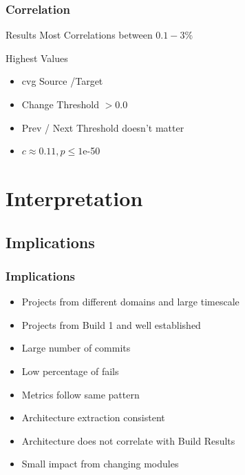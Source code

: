 \documentclass{beamer}
\begin{document}
\begin{frame}
	\frametitle{Correlation}
	
	\begin{block}{Results}
		Most Correlations between $0.1- 3\%$
	\end{block}
	
	Highest Values
	\begin{itemize}
		\item cvg Source /Target
		\item Change Threshold $>0.0$
		\item Prev / Next Threshold doesn't matter
		\item $c\approx0.11, p\leq1$e-50
	\end{itemize}
	
	
\end{frame}

\section{Interpretation}
\subsection{Implications}
\begin{frame}
\frametitle{Implications}

\begin{itemize}
	\item Projects from different domains and large timescale
	\item Projects from Build 1 and well established
	\item Large number of commits
	\item Low percentage of fails
\end{itemize}
\pause
\begin{itemize}
	\item Metrics follow same pattern
	\item Architecture extraction consistent
\end{itemize}
\pause
\begin{itemize}	
	\item Architecture does not correlate with Build Results
	\item Small impact from changing modules
\end{itemize}

\end{frame}
\end{document}

